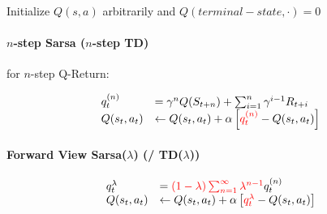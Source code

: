 \documentclass[10pt,landscape]{article}
\begin{document}
\begin{multicols}{3}

\begin{algorithm}[H]
    Initialize $Q(s,a)$ arbitrarily and $Q(terminal-state, ·) = 0$\\
\end{algorithm}
   
\paragraph{\texorpdfstring{$n$}{n}-step Sarsa (\texorpdfstring{$n$}{n}-step TD)}

for $n$-step Q-Return:

\begin{equation}
\begin{array}{l l}
    q_{t}^{(n)} &= \gamma^n Q(S_{t+n}) + \sum_{i=1}^{n} \gamma^{i-1} R_{t+i}\\
    Q(s_t, a_t) &\leftarrow Q(s_t, a_t) + \alpha \left[\textcolor{red}{q_t^{(n)}} - Q(s_t, a_t) \right]
\end{array}
\end{equation}

\paragraph{Forward View Sarsa(\texorpdfstring{$\lambda$}{lambda}) (/ TD(\texorpdfstring{$\lambda$}{lambda}))}

\begin{equation}
\begin{array}{l l}
    q_t^\lambda &= \textcolor{red}{(1-\lambda) \sum_{n=1}^\infty \lambda^{n-1}} q_t^{(n)}\\
    Q(s_t, a_t) &\leftarrow Q(s_t, a_t) + \alpha \left[\textcolor{red}{q_t^\lambda} - Q(s_t, a_t) \right]
\end{array}
\end{equation}


\end{multicols}
\end{document}
